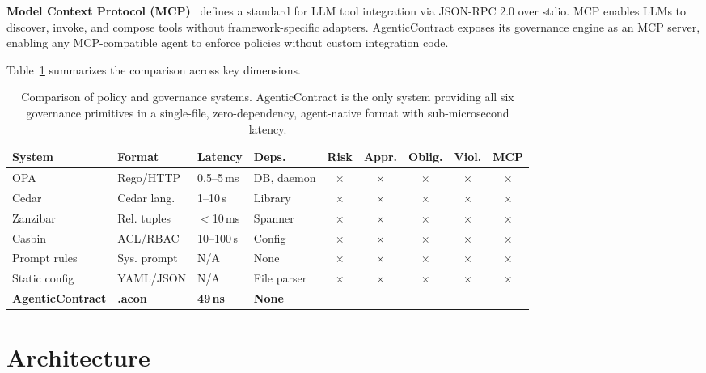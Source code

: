 \documentclass[10pt, twocolumn]{article}
\newcommand{\cmark}{\textcolor{acgreen}{\checkmark}}
\newcommand{\xmark}{\textcolor{acred}{$\times$}}
\begin{document}
\textbf{Model Context Protocol (MCP)}~\cite{mcp2024} defines a standard for LLM tool integration via JSON-RPC 2.0 over stdio. MCP enables LLMs to discover, invoke, and compose tools without framework-specific adapters. AgenticContract exposes its governance engine as an MCP server, enabling any MCP-compatible agent to enforce policies without custom integration code.

Table~\ref{tab:comparison} summarizes the comparison across key dimensions.

\begin{table}[t]
\caption{Comparison of policy and governance systems. AgenticContract is the only system providing all six governance primitives in a single-file, zero-dependency, agent-native format with sub-microsecond latency.}
\label{tab:comparison}
\centering
\small
\begin{tabular}{@{}llllccccc@{}}
\toprule
\textbf{System} & \textbf{Format} & \textbf{Latency} & \textbf{Deps.} & \textbf{Risk} & \textbf{Appr.} & \textbf{Oblig.} & \textbf{Viol.} & \textbf{MCP} \\
\midrule
OPA~\cite{opa2018} & Rego/HTTP & 0.5--5\,ms & DB, daemon & \xmark & \xmark & \xmark & \xmark & \xmark \\
Cedar~\cite{cedar2023} & Cedar lang. & 1--10\,\textmu{}s & Library & \xmark & \xmark & \xmark & \xmark & \xmark \\
Zanzibar~\cite{zanzibar2019} & Rel. tuples & $<$10\,ms & Spanner & \xmark & \xmark & \xmark & \xmark & \xmark \\
Casbin~\cite{casbin} & ACL/RBAC & 10--100\,\textmu{}s & Config & \xmark & \xmark & \xmark & \xmark & \xmark \\
Prompt rules & Sys. prompt & N/A & None & \xmark & \xmark & \xmark & \xmark & \xmark \\
Static config & YAML/JSON & N/A & File parser & \xmark & \xmark & \xmark & \xmark & \xmark \\
\textbf{AgenticContract} & \textbf{.acon} & \textbf{49\,ns} & \textbf{None} & \cmark & \cmark & \cmark & \cmark & \cmark \\
\bottomrule
\end{tabular}
\end{table}

\section{Architecture}
\label{sec:architecture}
\end{document}
